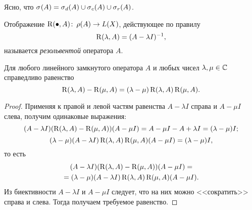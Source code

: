Ясно, что $\spectrum{A} = \spectrum[d]{A} \cup \spectrum[c]{A} \cup \spectrum[r]{A}$.

\begin{definition}
    Отображение $\operatorname{R}(\bullet, A) \colon \operatorname{\rho}(A) \to L(X)$, действующее по правилу
    \[ \operatorname{R}(\lambda, A) = (A - \lambda I)^{-1}, \]
    называется \emph{резольвентой} оператора $A$.
\end{definition}

\begin{theorem}
    Для любого линейного замкнутого оператора $A$ и любых чисел $\lambda, \mu \in \mathbb{C}$ 
    справедливо равенство
    \[ \operatorname{R}(\lambda, A) - \operatorname{R}(\mu, A) 
        = (\lambda - \mu) \operatorname{R}(\lambda, A)\operatorname{R}(\mu, A). \]
\end{theorem}

\begin{proof}
    Применяя к правой и левой частям равенства $A - \lambda I$ справа и $A - \mu I$ слева, получим
    одинаковые выражения:
    \[ (A - \lambda I)(\operatorname{R}(\lambda, A) - \operatorname{R}(\mu, A))(A - \mu I) = 
    A - \mu I - A + \lambda I = (\lambda - \mu) I; \]
    \[ (\lambda - \mu)(A - \lambda I)\operatorname{R}(\lambda, A)\operatorname{R}(\mu, A)(A - \mu I) = 
    (\lambda - \mu) I, \]
    то есть
    \begin{multline*}
        (A - \lambda I)(\operatorname{R}(\lambda, A) - \operatorname{R}(\mu, A))(A - \mu I) =\\=
          (\lambda - \mu)(A - \lambda I)\operatorname{R}(\lambda, A)\operatorname{R}(\mu, A)(A - \mu I).
    \end{multline*} 
    Из биективности $A - \lambda I$ и $A - \mu I$ следует, что на них можно <<сократить>>
    справа и слева. Тогда получаем требуемое равенство.
\end{proof}
